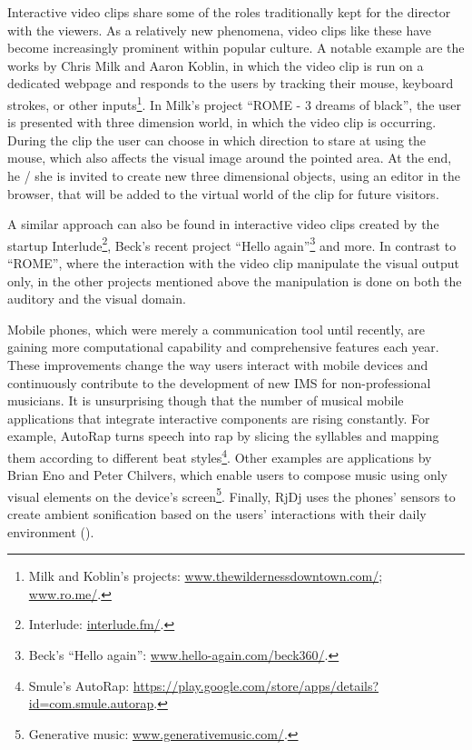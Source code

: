 \documentclass[a4paper,11pt]{article}
\begin{document}
Interactive video clips share some of the roles traditionally kept for the director with the viewers.
As a relatively new phenomena, video clips like these have become increasingly prominent within popular culture.
A notable example are the works by Chris Milk and Aaron Koblin, in which the video clip is run on a dedicated webpage and responds to the users by tracking their mouse, keyboard strokes, or other inputs\footnote{Milk and Koblin's projects: \href{http://www.thewildernessdowntown.com/}{www.thewildernessdowntown.com/}; \href{http://www.ro.me/}{www.ro.me/}.}.
In Milk's project ``ROME - 3 dreams of black'', the user is presented with three dimension world, in which the video clip is occurring.
During the clip the user can choose in which direction to stare at using the mouse, which also affects the visual image around the pointed area.
At the end, he / she is invited to create new three dimensional objects, using an editor in the browser, that will be added to the virtual world of the clip for future visitors.

A similar approach can also be found in interactive video clips created by the startup Interlude\footnote{Interlude: \href{http://interlude.fm/}{interlude.fm/}.}, Beck's recent project ``Hello again''\footnote{Beck's ``Hello again'': \href{http://www.hello-again.com/beck360/}{www.hello-again.com/beck360/}.} and more.
In contrast to ``ROME'', where the interaction with the video clip manipulate the visual output only, in the other projects mentioned above the manipulation is done on both the auditory and the visual domain.

Mobile phones, which were merely a communication tool until recently, are gaining more computational capability and comprehensive features each year.
These improvements change the way users interact with mobile devices and continuously contribute to the development of new IMS for non-professional musicians.
It is unsurprising though that the number of musical mobile applications that integrate interactive components are rising constantly.
For example, AutoRap turns speech into rap by slicing the syllables and mapping them according to different beat styles\footnote{Smule's AutoRap: \href{https://play.google.com/store/apps/details?id=com.smule.autorap}{https://play.google.com/store/apps/details?id=com.smule.autorap}.}.
Other examples are applications by Brian Eno and Peter Chilvers, which enable users to compose music using only visual elements on the device's screen\footnote{Generative music: \href{http://www.generativemusic.com/}{www.generativemusic.com/}.}.
Finally, RjDj uses the phones' sensors to create ambient sonification based on the users' interactions with their daily environment (\cite{web:rjdj})\label{rjdj}.
\end{document}
